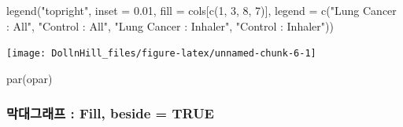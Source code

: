 \documentclass[
]{article}
\newenvironment{Shaded}{\begin{snugshade}}{\end{snugshade}}
\newcommand{\AttributeTok}[1]{\textcolor[rgb]{0.77,0.63,0.00}{#1}}
\newcommand{\DecValTok}[1]{\textcolor[rgb]{0.00,0.00,0.81}{#1}}
\newcommand{\FloatTok}[1]{\textcolor[rgb]{0.00,0.00,0.81}{#1}}
\newcommand{\FunctionTok}[1]{\textcolor[rgb]{0.00,0.00,0.00}{#1}}
\newcommand{\NormalTok}[1]{#1}
\newcommand{\StringTok}[1]{\textcolor[rgb]{0.31,0.60,0.02}{#1}}
\begin{document}
\begin{Shaded}
\begin{Highlighting}[]
\FunctionTok{legend}\NormalTok{(}\StringTok{"topright"}\NormalTok{, }
       \AttributeTok{inset =} \FloatTok{0.01}\NormalTok{,}
       \AttributeTok{fill =}\NormalTok{ cols[}\FunctionTok{c}\NormalTok{(}\DecValTok{1}\NormalTok{, }\DecValTok{3}\NormalTok{, }\DecValTok{8}\NormalTok{, }\DecValTok{7}\NormalTok{)], }
       \AttributeTok{legend =} \FunctionTok{c}\NormalTok{(}\StringTok{"Lung Cancer : All"}\NormalTok{, }
                  \StringTok{"Control : All"}\NormalTok{,}
                  \StringTok{"Lung Cancer : Inhaler"}\NormalTok{,}
                  \StringTok{"Control : Inhaler"}\NormalTok{))}
\end{Highlighting}
\end{Shaded}

\begin{flushleft}\texttt{[image: DollnHill\_files/figure-latex/unnamed-chunk-6-1]} \end{flushleft}

\begin{Shaded}
\begin{Highlighting}[]
\FunctionTok{par}\NormalTok{(opar)}
\end{Highlighting}
\end{Shaded}

\hypertarget{uxb9c9uxb300uxadf8uxb798uxd504-fill-beside-true}{%
\subsubsection{막대그래프 : Fill, beside =
TRUE}\label{uxb9c9uxb300uxadf8uxb798uxd504-fill-beside-true}}
\end{document}
